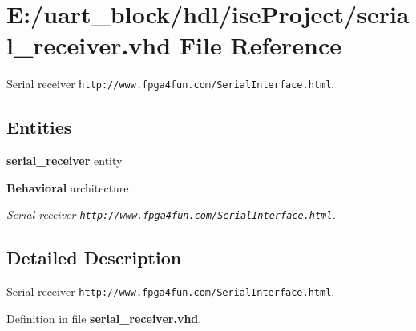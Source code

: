 \section{E\-:/uart\-\_\-block/hdl/ise\-Project/serial\-\_\-receiver.vhd File Reference}
\label{serial__receiver_8vhd}


Serial receiver {\tt http\-://www.\-fpga4fun.\-com/\-Serial\-Interface.\-html}.  


\subsection*{Entities}
\begin{DoxyCompactItemize}
\item 
{\bf serial\-\_\-receiver} entity
\item 
{\bf Behavioral} architecture
\begin{DoxyCompactList}\small\item\em Serial receiver {\tt http\-://www.\-fpga4fun.\-com/\-Serial\-Interface.\-html}. \end{DoxyCompactList}\end{DoxyCompactItemize}


\subsection{Detailed Description}
Serial receiver {\tt http\-://www.\-fpga4fun.\-com/\-Serial\-Interface.\-html}. 

Definition in file {\bf serial\-\_\-receiver.\-vhd}.


